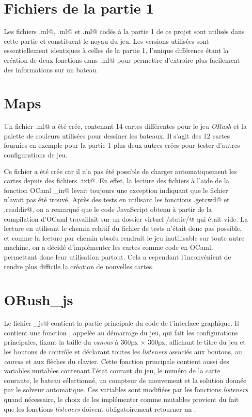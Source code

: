 \documentclass[a4paper,12pt]{article}
\begin{document}
\section{Fichiers de la partie 1}

Les fichiers \verb@port.ml@, \verb@moves.ml@ et \verb@solver.ml@ codés à la partie 1 de ce projet sont utilisés dans cette partie et constituent le noyau du jeu. Les versions utilisées sont essentiellement identiques à celles de la partie 1, l'unique différence étant la création de deux fonctions dans \verb@port.ml@ pour permettre d'extraire plus facilement des informations sur un bateau.

\section{Maps}

Un fichier \verb@maps.ml@ a été crée, contenant 14 cartes différentes pour le jeu \emph{ORush} et la palette de couleurs utilisées pour dessiner les bateaux. Il s'agit des 12 cartes fournies en exemple pour la partie 1 plus deux autres crées pour tester d'autres configurations de jeu.

Ce fichier a été crée car il n'a pas été possible de charger automatiquement les cartes depuis des fichiers \verb@.txt@. En effet, la lecture des fichiers à l'aide de la fonction OCaml \verb@open_in@ levait toujours une exception indiquant que le fichier n'avait pas été trouvé. Après des tests en utilisant les fonctions \verb@Sys.getcwd@ et \verb@Sys.readdir@, on a remarqué que le code JavaScript obtenu à partir de la compilation d'OCaml travaillait sur un dossier virtuel \verb@/static/@ qui était vide. La lecture en utilisant le chemin relatif du fichier de tests n'était donc pas possible, et comme la lecture par chemin absolu rendrait le jeu inutilisable sur toute autre machine, on a décidé d'implémenter les cartes comme code en OCaml, permettant donc leur utilisation partout. Cela a cependant l'inconvénient de rendre plus difficile la création de nouvelles cartes.

\section{ORush\_js}

Le fichier \verb@orush_js@ contient la partie principale du code de l'interface graphique. Il contient une fonction \verb@main@, appelée au démarrage du jeu, qui fait les configurations principales, fixant la taille du \emph{canvas} à 360px $\times$ 360px, affichant le titre du jeu et les boutons de contrôle et déclarant toutes les \emph{listeners} associés aux boutons, au \emph{canvas} et aux flèches du clavier. Cette fonction principale contient aussi des variables mutables contenant l'état courant du jeu, le numéro de la carte courante, le bateau sélectionné, un compteur de mouvement et la solution donnée par le solveur automatique. Ces variables sont modifiées par les fonctions \emph{listeners} quand nécessaire, le choix de les implémenter comme mutables provient du fait que les fonctions \emph{listeners} doivent obligatoirement retourner un \verb@unit@.
\end{document}

